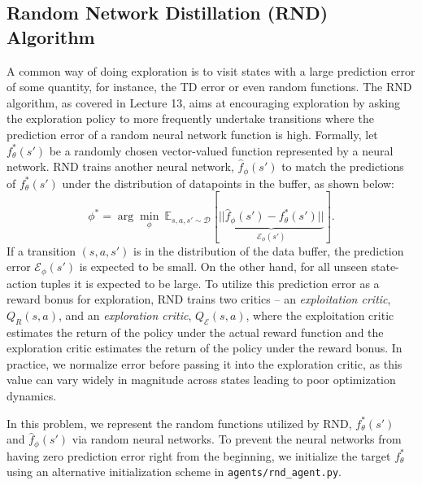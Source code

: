 \documentclass{article}
\begin{document}
\subsection{Random Network Distillation (RND) Algorithm}
A common way of doing exploration is to visit states with a large prediction error of some quantity, for instance, the TD error or even random functions. The RND algorithm, as covered in Lecture 13, aims at encouraging exploration by asking the exploration policy to more frequently undertake transitions where the prediction error of a random neural network function is high. Formally, let ${f}_\theta^*(s')$ be a randomly chosen vector-valued function represented by a neural network. RND trains another neural network, $\hat{f}_\phi(s')$ to match the predictions of $f^*_\theta(s')$ under the distribution of datapoints in the buffer, as shown below:
\begin{equation}
    \phi^* = \arg \min_\phi~ \mathbb{E}_{s, a, s' \sim \mathcal{D}} \left[\underbrace{||\hat{f}_\phi(s') - f^*_\theta(s')||}_{\mathcal{E}_\phi(s')} \right].
\end{equation}
If a transition $(s, a, s')$ is in the distribution of the data buffer, the prediction error $\mathcal{E}_\phi(s')$ is expected to be small. On the other hand, for all unseen state-action tuples it is expected to be large. To utilize this prediction error as a reward bonus for exploration, RND trains two critics -- an \emph{exploitation critic}, $Q_R(s, a)$, and an \emph{exploration critic}, $Q_\mathcal{E}(s, a)$, where the exploitation critic estimates the return of the policy under the actual reward function and the exploration critic estimates the return of the policy under the reward bonus. In practice, we normalize error before passing it into the exploration critic, as this value can vary widely in magnitude across states leading to poor optimization dynamics.

In this problem, we represent the random functions utilized by RND, $f^*_\theta(s')$ and $\hat{f}_\phi(s')$ via random neural networks. To prevent the neural networks from having zero prediction error right from the beginning, we initialize the target $f^*_\theta$ using an alternative initialization scheme in \verb+agents/rnd_agent.py+. 
\end{document}
